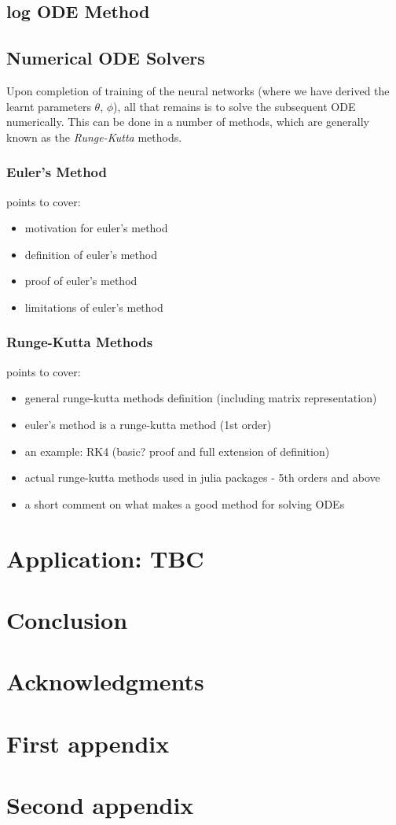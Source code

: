 \documentclass[a4paper,11pt, titlepage]{article}
\theoremstyle{definition}
\theoremstyle{plain}
\theoremstyle{remark}
\begin{document}
\subsection{log ODE Method}

\subsection{Numerical ODE Solvers}
Upon completion of training of the neural networks (where we have derived the learnt parameters $\theta$, $\phi$), all that remains is to solve the subsequent ODE numerically. This can be done in a number of methods, which are generally known as the \textit{Runge-Kutta} methods.

\subsubsection{Euler's Method}
points to cover:
\begin{itemize}
    \item motivation for euler's method
    \item definition of euler's method
    \item proof of euler's method
    \item limitations of euler's method
\end{itemize}

\subsubsection{Runge-Kutta Methods}
points to cover:
\begin{itemize}
    \item general runge-kutta methods definition (including matrix representation)
    \item euler's method is a runge-kutta method (1st order)
    \item an example: RK4 (basic? proof and full extension of definition)
    \item actual runge-kutta methods used in julia packages - 5th orders and above  
    \item a short comment on what makes a good method for solving ODEs
\end{itemize}

\section{Application: TBC}

\section{Conclusion}

\section*{Acknowledgments}

\appendix

\section{First appendix}

\section{Second appendix}


\end{document}
